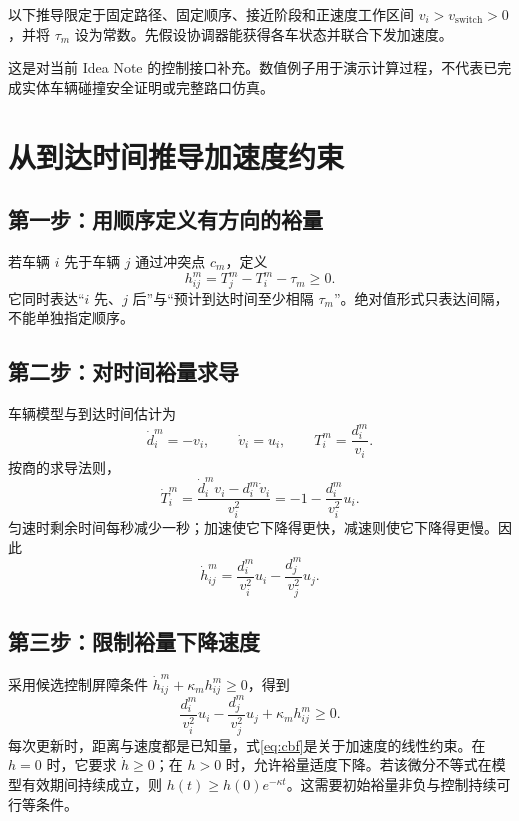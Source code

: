 \documentclass[UTF8,fontset=fandol,11pt,a4paper]{ctexart}
\begin{document}
以下推导限定于固定路径、固定顺序、接近阶段和正速度工作区间 $v_i>v_{\mathrm{switch}}>0$，并将 $\tau_m$ 设为常数。先假设协调器能获得各车状态并联合下发加速度。

这是对当前 Idea Note 的控制接口补充。数值例子用于演示计算过程，不代表已完成实体车辆碰撞安全证明或完整路口仿真。

\newpage
\section{从到达时间推导加速度约束}
\subsection{第一步：用顺序定义有方向的裕量}
若车辆 $i$ 先于车辆 $j$ 通过冲突点 $c_m$，定义
\begin{equation}
h_{ij}^m=T_j^m-T_i^m-\tau_m\geq0.
\end{equation}
它同时表达“$i$ 先、$j$ 后”与“预计到达时间至少相隔 $\tau_m$”。绝对值形式只表达间隔，不能单独指定顺序。

\subsection{第二步：对时间裕量求导}
车辆模型与到达时间估计为
\begin{equation}
\dot d_i^m=-v_i,\qquad \dot v_i=u_i,\qquad T_i^m=\frac{d_i^m}{v_i}.
\end{equation}
按商的求导法则，
\begin{equation}
\dot T_i^m=\frac{\dot d_i^m v_i-d_i^m\dot v_i}{v_i^2}
=-1-\frac{d_i^m}{v_i^2}u_i.
\end{equation}
匀速时剩余时间每秒减少一秒；加速使它下降得更快，减速则使它下降得更慢。因此
\begin{equation}
\dot h_{ij}^m=\frac{d_i^m}{v_i^2}u_i-\frac{d_j^m}{v_j^2}u_j.
\end{equation}

\subsection{第三步：限制裕量下降速度}
采用候选控制屏障条件 $\dot h_{ij}^m+\kappa_m h_{ij}^m\geq0$，得到
\begin{equation}\boxed{
\frac{d_i^m}{v_i^2}u_i-\frac{d_j^m}{v_j^2}u_j
+\kappa_m h_{ij}^m\geq0.}
\label{eq:cbf}
\end{equation}
每次更新时，距离与速度都是已知量，式\eqref{eq:cbf}是关于加速度的线性约束。在 $h=0$ 时，它要求 $\dot h\geq0$；在 $h>0$ 时，允许裕量适度下降。若该微分不等式在模型有效期间持续成立，则 $h(t)\geq h(0)e^{-\kappa t}$。这需要初始裕量非负与控制持续可行等条件。
\end{document}
